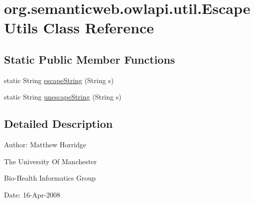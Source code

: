 \hypertarget{classorg_1_1semanticweb_1_1owlapi_1_1util_1_1_escape_utils}{\section{org.\-semanticweb.\-owlapi.\-util.\-Escape\-Utils Class Reference}
\label{classorg_1_1semanticweb_1_1owlapi_1_1util_1_1_escape_utils}
}
\subsection*{Static Public Member Functions}
\begin{DoxyCompactItemize}
\item 
static String \hyperlink{classorg_1_1semanticweb_1_1owlapi_1_1util_1_1_escape_utils_a79428a422e9cef67fee4450ab6fce684}{escape\-String} (String s)
\item 
static String \hyperlink{classorg_1_1semanticweb_1_1owlapi_1_1util_1_1_escape_utils_a8faa75f0779e7033e1d202cd4210f5cf}{unescape\-String} (String s)
\end{DoxyCompactItemize}


\subsection{Detailed Description}
Author\-: Matthew Horridge\par
 The University Of Manchester\par
 Bio-\/\-Health Informatics Group\par
 Date\-: 16-\/\-Apr-\/2008\par
\par
 

